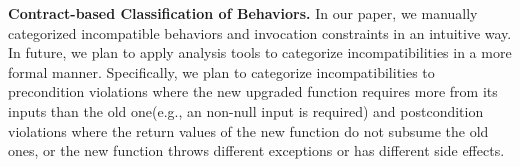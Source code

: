 
\textbf{Contract-based Classification of Behaviors.} In our paper, we manually categorized incompatible behaviors and invocation constraints in an intuitive way. In future, we plan to apply analysis tools to categorize incompatibilities in a more formal manner. Specifically, we plan to categorize incompatibilities to precondition violations where the new upgraded function requires more from its inputs than the old one(e.g., an non-null input is required) and postcondition violations where the return values of the new function do not subsume the old ones, or the new function throws different exceptions or has different side effects. 




%









